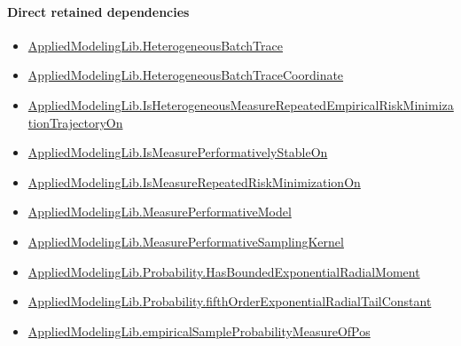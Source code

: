 \documentclass[10pt]{article}
\begin{document}
\paragraph{Direct retained dependencies}
\begin{itemize}\raggedright
\item \hyperlink{governing-declaration-307f711c4bf618c0}{Applied\allowbreak{}Modeling\allowbreak{}Lib.\allowbreak{}Heterogeneous\allowbreak{}Batch\allowbreak{}Trace}
\item \hyperlink{governing-declaration-37d7ae049de215a7}{Applied\allowbreak{}Modeling\allowbreak{}Lib.\allowbreak{}Heterogeneous\allowbreak{}Batch\allowbreak{}Trace\allowbreak{}Coordinate}
\item \hyperlink{governing-declaration-50fa794af5bef559}{Applied\allowbreak{}Modeling\allowbreak{}Lib.\allowbreak{}Is\allowbreak{}Heterogeneous\allowbreak{}Measure\allowbreak{}Repeated\allowbreak{}Empirical\allowbreak{}Risk\allowbreak{}Minimization\allowbreak{}Trajectory\allowbreak{}On}
\item \hyperlink{governing-declaration-522b06e211b1e40a}{Applied\allowbreak{}Modeling\allowbreak{}Lib.\allowbreak{}Is\allowbreak{}Measure\allowbreak{}Performatively\allowbreak{}Stable\allowbreak{}On}
\item \hyperlink{governing-declaration-6ae86e5703739171}{Applied\allowbreak{}Modeling\allowbreak{}Lib.\allowbreak{}Is\allowbreak{}Measure\allowbreak{}Repeated\allowbreak{}Risk\allowbreak{}Minimization\allowbreak{}On}
\item \hyperlink{library-prerequisite-96553d4fbb82f1ac}{Applied\allowbreak{}Modeling\allowbreak{}Lib.\allowbreak{}Measure\allowbreak{}Performative\allowbreak{}Model}
\item \hyperlink{governing-declaration-527443e0fb077287}{Applied\allowbreak{}Modeling\allowbreak{}Lib.\allowbreak{}Measure\allowbreak{}Performative\allowbreak{}Sampling\allowbreak{}Kernel}
\item \hyperlink{governing-declaration-9604ed56aea35d91}{Applied\allowbreak{}Modeling\allowbreak{}Lib.\allowbreak{}Probability.\allowbreak{}Has\allowbreak{}Bounded\allowbreak{}Exponential\allowbreak{}Radial\allowbreak{}Moment}
\item \hyperlink{governing-declaration-93c495b865c4b878}{Applied\allowbreak{}Modeling\allowbreak{}Lib.\allowbreak{}Probability.\allowbreak{}fifth\allowbreak{}Order\allowbreak{}Exponential\allowbreak{}Radial\allowbreak{}Tail\allowbreak{}Constant}
\item \hyperlink{governing-declaration-cbd1f5f969456e5f}{Applied\allowbreak{}Modeling\allowbreak{}Lib.\allowbreak{}empirical\allowbreak{}Sample\allowbreak{}Probability\allowbreak{}Measure\allowbreak{}Of\allowbreak{}Pos}

\end{itemize}
\end{document}
